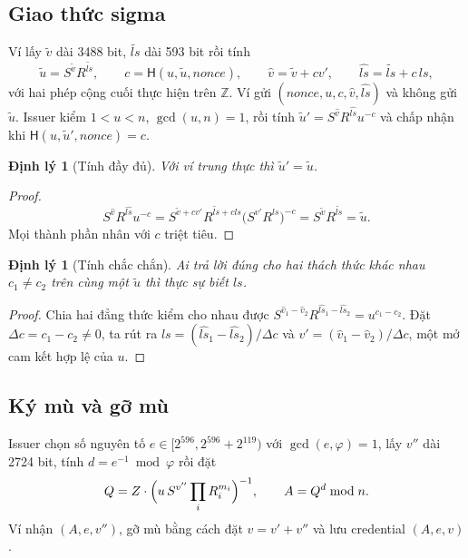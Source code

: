 \documentclass[a4paper,11pt,oneside]{report}
\theoremstyle{definition}
\theoremstyle{plain}
\newtheorem{theorem}[definition]{Định lý}
\newcommand{\Hash}{\mathsf{H}}
\begin{document}
\subsection{Giao thức sigma}

Ví lấy $\tilde v$ dài 3488 bit, $\widetilde{\mathit{ls}}$ dài 593 bit rồi tính
\[
\tilde u = S^{\tilde v} R^{\widetilde{\mathit{ls}}}, \qquad
c = \Hash(u, \tilde u, \mathit{nonce}), \qquad
\hat v = \tilde v + c v', \qquad
\widehat{\mathit{ls}} = \widetilde{\mathit{ls}} + c\,\mathit{ls},
\]
với hai phép cộng cuối thực hiện trên $\mathbb{Z}$. Ví gửi
$(\mathit{nonce}, u, c, \hat v, \widehat{\mathit{ls}})$ và không gửi $\tilde u$.
Issuer kiểm $1 < u < n$, $\gcd(u,n) = 1$, rồi tính
$\tilde u' = S^{\hat v} R^{\widehat{\mathit{ls}}} u^{-c}$ và chấp nhận khi
$\Hash(u, \tilde u', \mathit{nonce}) = c$.

\begin{theorem}[Tính đầy đủ]
Với ví trung thực thì $\tilde u' = \tilde u$.
\end{theorem}

\begin{proof}
\[
S^{\hat v} R^{\widehat{\mathit{ls}}} u^{-c}
= S^{\tilde v + c v'} R^{\widetilde{\mathit{ls}} + c\mathit{ls}}
  \bigl(S^{v'} R^{\mathit{ls}}\bigr)^{-c}
= S^{\tilde v} R^{\widetilde{\mathit{ls}}} = \tilde u .
\]
Mọi thành phần nhân với $c$ triệt tiêu.
\end{proof}

\begin{theorem}[Tính chắc chắn]
Ai trả lời đúng cho hai thách thức khác nhau $c_1 \neq c_2$ trên cùng một $\tilde u$ thì thực sự
biết $\mathit{ls}$.
\end{theorem}

\begin{proof}
Chia hai đẳng thức kiểm cho nhau được
$S^{\hat v_1 - \hat v_2} R^{\widehat{\mathit{ls}}_1 - \widehat{\mathit{ls}}_2} = u^{c_1 - c_2}$.
Đặt $\Delta c = c_1 - c_2 \neq 0$, ta rút ra
$\mathit{ls} = (\widehat{\mathit{ls}}_1 - \widehat{\mathit{ls}}_2)/\Delta c$ và
$v' = (\hat v_1 - \hat v_2)/\Delta c$, một mở cam kết hợp lệ của $u$.
\end{proof}

\subsection{Ký mù và gỡ mù}

Issuer chọn số nguyên tố $e \in [2^{596}, 2^{596} + 2^{119})$ với $\gcd(e, \varphi) = 1$, lấy
$v''$ dài 2724 bit, tính $d = e^{-1} \bmod \varphi$ rồi đặt
\begin{equation}
Q = Z \cdot \Bigl( u\, S^{v''} \prod_i R_i^{m_i} \Bigr)^{-1}, \qquad A = Q^{d} \bmod n .
\end{equation}
Ví nhận $(A, e, v'')$, gỡ mù bằng cách đặt $v = v' + v''$ và lưu
credential $(A, e, v)$.
\end{document}
